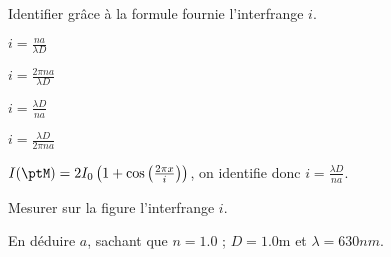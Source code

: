 \debutEntrainement


\begin{enonce}
Identifier grâce à la formule fournie l'interfrange $i$.
\begin{listeQCM4Colonnes}
	\item $i=\frac{na}{\lambda D}$
	\item $i=\frac{2\pi na}{\lambda D}$
	\item $i=\frac{\lambda D}{na}$
	\item $i=\frac{\lambda D}{2\pi na}$
\end{listeQCM4Colonnes}
\bigskip
\end{enonce}



\reponse{\reponseC{}}

\begin{corrige}
	$I(\ptM)=2I_0 \left(1+\cos\left(\frac{2\pi x}{i}\right)\right)$, on identifie donc $i=\frac{\lambda D}{na}$.
\end{corrige}




\begin{enonce}
Mesurer sur la figure l'interfrange $i$.
\end{enonce}






\begin{enonce}
En déduire $a$, sachant que $n=\num{1.0}$ ; $D=\num{1.0}\si{\metre}$ et $\lambda=\num{630}\si{nm}$.
\end{enonce}


